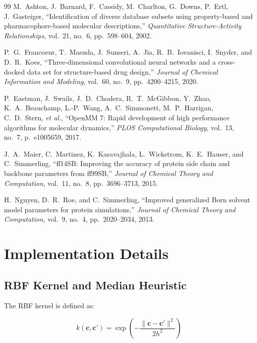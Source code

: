 \documentclass[a4paper,11pt]{article}
\begin{document}
\begin{thebibliography}{99}
M.~Ashton, J.~Barnard, F.~Cassidy, M.~Charlton, G.~Downs, P.~Ertl, J.~Gasteiger,
``Identification of diverse database subsets using property-based and
pharmacophore-based molecular descriptions,''
\emph{Quantitative Structure-Activity Relationships}, vol.~21, no.~6,
pp.~598--604, 2002.

P.~G.~Francoeur, T.~Masuda, J.~Sunseri, A.~Jia, R.~B.~Iovanisci, I.~Snyder,
and D.~R.~Koes,
``Three-dimensional convolutional neural networks and a cross-docked data set
for structure-based drug design,''
\emph{Journal of Chemical Information and Modeling}, vol.~60, no.~9,
pp.~4200--4215, 2020.

P.~Eastman, J.~Swails, J.~D.~Chodera, R.~T.~McGibbon, Y.~Zhao, K.~A.~Beauchamp,
L.-P.~Wang, A.~C.~Simmonett, M.~P.~Harrigan, C.~D.~Stern, \emph{et al.},
``OpenMM 7: Rapid development of high performance algorithms for molecular
dynamics,''
\emph{PLOS Computational Biology}, vol.~13, no.~7, p.~e1005659, 2017.

J.~A.~Maier, C.~Martinez, K.~Kasavajhala, L.~Wickstrom, K.~E.~Hauser, and
C.~Simmerling,
``ff14SB: Improving the accuracy of protein side chain and backbone parameters
from ff99SB,''
\emph{Journal of Chemical Theory and Computation}, vol.~11, no.~8,
pp.~3696--3713, 2015.

H.~Nguyen, D.~R.~Roe, and C.~Simmerling,
``Improved generalized Born solvent model parameters for protein simulations,''
\emph{Journal of Chemical Theory and Computation}, vol.~9, no.~4,
pp.~2020--2034, 2013.

\end{thebibliography}

\appendix

\section{Implementation Details}

\subsection{RBF Kernel and Median Heuristic}

The RBF kernel is defined as:

\begin{equation}
k(\mathbf{c}, \mathbf{c}') = \exp\left(-\frac{\|\mathbf{c} - \mathbf{c}'\|^2}{2h^2}\right)
\end{equation}
\end{document}
